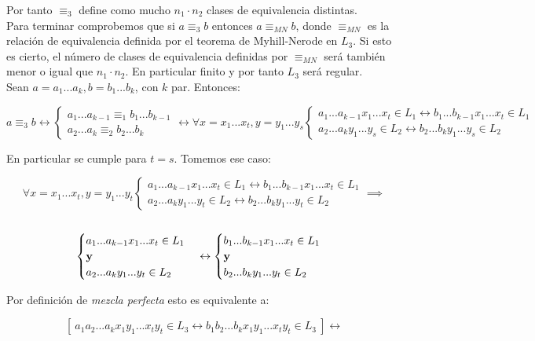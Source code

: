\documentclass[11pt,a4paper]{article}
\begin{document}
Por tanto $\equiv_3$ define como mucho $n_1 \cdot n_2$ clases de equivalencia distintas. \\

Para terminar comprobemos que si $a \equiv_3 b$ entonces $a \equiv_{MN} b$, donde $\equiv_{MN}$ es la relación de equivalencia definida por el teorema de Myhill-Nerode en $L_3$. Si esto es cierto, el número de clases de equivalencia definidas por $\equiv_{MN}$ será también menor o igual que $n_1 \cdot n_2$. En particular finito y por tanto $L_3$ será regular. \\

Sean $a = a_1...a_k, b = b_1...b_k$, con $k$ par. Entonces:

$$ a \equiv_3 b \leftrightarrow \begin{cases} a_1...a_{k-1} \equiv_1 b_1...b_{k-1} \\ a_2...a_k \equiv_2 b_2...b_k \end{cases} \leftrightarrow \forall x = x_1...x_t,y = y_1...y_s \begin{cases} a_1...a_{k-1}x_1...x_t \in L_1 \leftrightarrow b_1...b_{k-1}x_1...x_t \in L_1 \\ a_2...a_ky_1...y_s \in L_2 \leftrightarrow b_2...b_ky_1...y_s \in L_2 \end{cases}$$

En particular se cumple para $t=s$. Tomemos ese caso:

$$\forall x = x_1...x_t,y = y_1...y_t\begin{cases} a_1...a_{k-1}x_1...x_t \in L_1 \leftrightarrow b_1...b_{k-1}x_1...x_t \in L_1 \\ a_2...a_ky_1...y_t \in L_2 \leftrightarrow b_2...b_ky_1...y_t \in L_2 \end{cases} 
\implies $$ \\
$$\begin{cases} a_1...a_{k-1}x_1...x_t \in L_1 \\ \text{\textbf{y}} \\ a_2...a_ky_1...y_t \in L_2 \end{cases} \leftrightarrow \begin{cases} b_1...b_{k-1}x_1...x_t \in L_1 \\ \text{\textbf{y}} \\ b_2...b_ky_1...y_t \in L_2 \end{cases}$$

Por definición de \emph{mezcla perfecta} esto es equivalente a:

$$[\ a_1a_2...a_kx_1y_1...x_ty_t \in L_3 \leftrightarrow b_1b_2...b_kx_1y_1...x_ty_t \in L_3 \ ] \leftrightarrow $$
\end{document}
